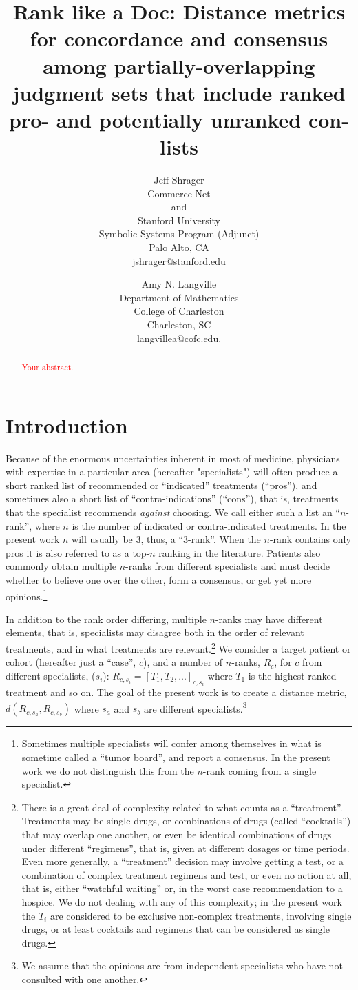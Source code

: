 \documentclass{article}
\title{Rank like a Doc: Distance metrics for concordance and consensus among partially-overlapping judgment sets that include ranked pro- and potentially unranked con- lists}
\author{Jeff Shrager\\ 
Commerce Net \\ and \\Stanford University\\ Symbolic Systems Program (Adjunct) \\Palo Alto, CA \\jshrager@stanford.edu
\and Amy N. Langville \\ Department of Mathematics\\ College of Charleston \\Charleston, SC \\ langvillea@cofc.edu.}
\begin{document}
\maketitle

\begin{abstract}
\textcolor{red}{Your abstract.}
\end{abstract}

\newpage
\section{Introduction}

Because of the enormous uncertainties inherent in most of medicine, physicians with expertise in a particular area (hereafter "specialists") will often produce a short ranked list of recommended or ``indicated'' treatments (``pros''), and sometimes also a short list of ``contra-indications'' (``cons''), that is, treatments that the specialist recommends \textit{against} choosing. We call either such a list an ``$n$-rank'', where $n$ is the number of indicated or contra-indicated treatments. In the present work $n$ will usually be $3$, thus, a ``3-rank''. When the $n$-rank contains only pros it is also referred to as a top-$n$ ranking in the literature. Patients also commonly obtain multiple $n$-ranks from different specialists and must decide whether to believe one over the other, form a consensus, or get yet more opinions.\footnote{Sometimes multiple specialists will confer among themselves in what is sometime called a ``tumor board'', and report a consensus. In the present work we do not distinguish this from the $n$-rank coming from a single specialist.} 

In addition to the rank order differing, multiple $n$-ranks may have different elements, that is, specialists may disagree both in the order of relevant treatments, and in what treatments are relevant.\footnote{There is a great deal of complexity related to what counts as a ``treatment''. Treatments may be single drugs, or combinations of drugs (called ``cocktails'') that may overlap one another, or even be identical combinations of drugs under different ``regimens'', that is, given at different dosages or time periods. Even more generally, a ``treatment'' decision may involve getting a test, or a combination of complex treatment regimens and test, or even no action at all, that is, either ``watchful waiting'' or, in the worst case recommendation to a hospice. We do not dealing with any of this complexity; in the present work the $T_i$ are considered to be exclusive non-complex treatments, involving single drugs, or at least cocktails and regimens that can be considered as single drugs.} We consider a target patient or cohort (hereafter just a ``case'', $c$), and a number of $n$-ranks, $R_c$, for $c$ from different specialists, ($s_i$): $R_{c,s_i}=[T_1, T_2, ...]_{c,s_i}$ where $T_1$ is the highest ranked treatment and so on. The goal of the present work is to create a distance metric, $d(R_{c,s_a},R_{c,s_b})$ where $s_a$ and $s_b$ are different specialists.\footnote{We assume that the opinions are from independent specialists who have not consulted with one another.} 
\end{document}
